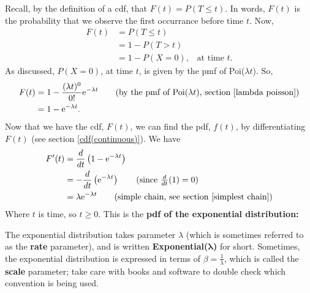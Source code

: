 \noindent Recall, by the definition of a cdf, that $F(t) = P(T \leq t)$. In words, $F(t)$ is the probability that we observe the first occurrance before time $t$. Now,
\begin{align*}
F(t) & = P(T \leq t) \\
      & = 1 - P(T > t)  \tag{probability measure axiom 1} \\
       & = 1 - P(X = 0), \;\;\; \text{at time $t$}. \tag{by our definition of $T$}
\end{align*}
As discussed, $P(X = 0)$, at time $t$, is given by the pmf of Poi($\lambda t$). So,
\begin{align*}
F(t) & = 1 - \frac{(\lambda t)^0}{0!}\e^{-\lambda t} \tag{by the pmf of Poi($\lambda t$), section \ref{lambda poisson}} \\
	& = 1 - \e^{-\lambda t}.
\end{align*}
Now that we have the cdf, $F(t)$, we can find the pdf, $f(t)$, by differentiating $F(t)$ (see section \ref{cdf(continuous)}). We have
\begin{align*}
F'(t)  & = \frac{d}{dt}\brac{1 - \e^{-\lambda t}} \\
	& = -\frac{d}{dt}\brac{\e^{-\lambda t}} \tag{since $\frac{d}{dt}(1) = 0$} \\
	& =  \lambda \e^{-\lambda t} \tag{simple chain, see section \ref{simplest chain}}
\end{align*}
Where $t$ is time, so $t \geq 0$. This is the \textbf{pdf of the exponential distribution:} \label{exponential pdf}

  	\bigskip
	
	\hfil{}
	\bigskip
	
\noindent The exponential distribution takes parameter $\lambda$ (which is sometimes referred to as the \textbf{rate} parameter), and is written \textbf{Exponential($\boldsymbol{\lambda}$)} for short. Sometimes, the exponential distribution is expressed in terms of $\beta = \frac{1}{\lambda}$, which is called the \textbf{scale} parameter; take care with books and software to double check which convention is being used. \label{rate (exponential)} \\

